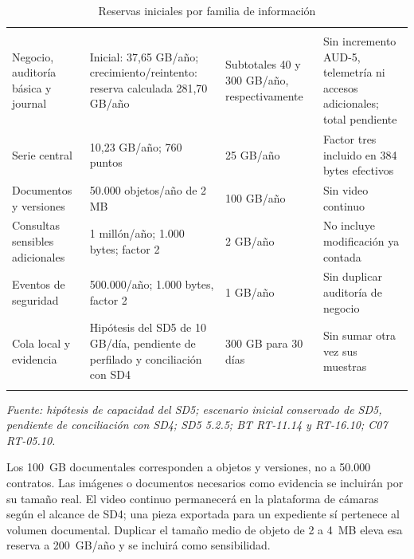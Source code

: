 \begingroup
\setlength{\tabcolsep}{3pt}
\begin{longtable}{@{}L{.26\textwidth}L{.29\textwidth}L{.20\textwidth}L{\dimexpr.25\textwidth-18pt\relax}@{}}
\caption{Reservas iniciales por familia de información}\label{tab:sd5_reservas_datos}\\
\hline
{} &  &  &  \\ \hline
\endfirsthead
\hline
{} &  &  &  \\ \hline
\endhead
Negocio, auditoría básica y journal & Inicial: 37,65 GB/año; crecimiento/reintento: reserva calculada 281,70 GB/año & Subtotales 40 y 300 GB/año, respectivamente & Sin incremento AUD-5, telemetría ni accesos adicionales; total pendiente \\ \addlinespace \hline
Serie central & 10,23 GB/año; 760 puntos & 25 GB/año & Factor tres incluido en 384 bytes efectivos \\ \addlinespace \hline
Documentos y versiones & 50.000 objetos/año de 2 MB & 100 GB/año & Sin video continuo \\ \addlinespace \hline
Consultas sensibles adicionales & 1 millón/año; 1.000 bytes; factor 2 & 2 GB/año & No incluye modificación ya contada \\ \addlinespace \hline
Eventos de seguridad & 500.000/año; 1.000 bytes, factor 2 & 1 GB/año & Sin duplicar auditoría de negocio \\ \addlinespace \hline
Cola local y evidencia & Hipótesis del SD5 de 10 GB/día, pendiente de perfilado y conciliación con SD4 & 300 GB para 30 días & Sin sumar otra vez sus muestras \\ \addlinespace \hline
\end{longtable}
\noindent\textit{Fuente: hipótesis de capacidad del SD5; escenario inicial conservado de SD5, pendiente de conciliación con SD4; SD5 5.2.5; BT RT-11.14 y RT-16.10; C07 RT-05.10.}\par
Los 100~GB documentales corresponden a objetos y versiones, no a 50.000 contratos. Las imágenes o documentos necesarios como evidencia se incluirán por su tamaño real. El video continuo permanecerá en la plataforma de cámaras según el alcance de SD4; una pieza exportada para un expediente sí pertenece al volumen documental. Duplicar el tamaño medio de objeto de 2 a 4~MB eleva esa reserva a 200~GB/año y se incluirá como sensibilidad.

